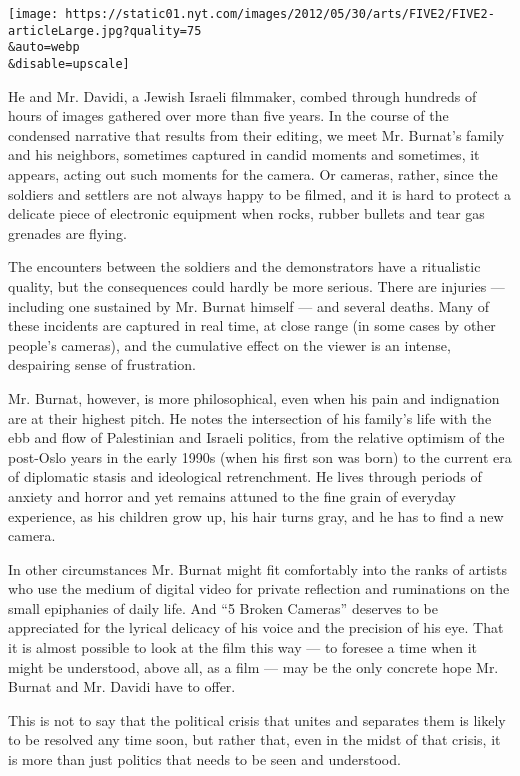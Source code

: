 \texttt{[image: https://static01.nyt.com/images/2012/05/30/arts/FIVE2/FIVE2-articleLarge.jpg?quality=75\\\&auto=webp\\\&disable=upscale]}

He and Mr. Davidi, a Jewish Israeli filmmaker, combed through hundreds
of hours of images gathered over more than five years. In the course of
the condensed narrative that results from their editing, we meet Mr.
Burnat's family and his neighbors, sometimes captured in candid moments
and sometimes, it appears, acting out such moments for the camera. Or
cameras, rather, since the soldiers and settlers are not always happy to
be filmed, and it is hard to protect a delicate piece of electronic
equipment when rocks, rubber bullets and tear gas grenades are flying.

The encounters between the soldiers and the demonstrators have a
ritualistic quality, but the consequences could hardly be more serious.
There are injuries --- including one sustained by Mr. Burnat himself ---
and several deaths. Many of these incidents are captured in real time,
at close range (in some cases by other people's cameras), and the
cumulative effect on the viewer is an intense, despairing sense of
frustration.

Mr. Burnat, however, is more philosophical, even when his pain and
indignation are at their highest pitch. He notes the intersection of his
family's life with the ebb and flow of Palestinian and Israeli politics,
from the relative optimism of the post-Oslo years in the early 1990s
(when his first son was born) to the current era of diplomatic stasis
and ideological retrenchment. He lives through periods of anxiety and
horror and yet remains attuned to the fine grain of everyday experience,
as his children grow up, his hair turns gray, and he has to find a new
camera.

In other circumstances Mr. Burnat might fit comfortably into the ranks
of artists who use the medium of digital video for private reflection
and ruminations on the small epiphanies of daily life. And ``5 Broken
Cameras'' deserves to be appreciated for the lyrical delicacy of his
voice and the precision of his eye. That it is almost possible to look
at the film this way --- to foresee a time when it might be understood,
above all, as a film --- may be the only concrete hope Mr. Burnat and
Mr. Davidi have to offer.

This is not to say that the political crisis that unites and separates
them is likely to be resolved any time soon, but rather that, even in
the midst of that crisis, it is more than just politics that needs to be
seen and understood.

